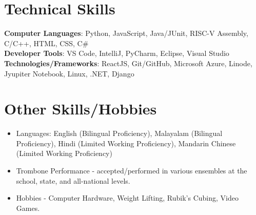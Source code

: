 \documentclass[letterpaper,11pt]{article}
\begin{document}
%
\section{Technical Skills}
 \begin{itemize}[leftmargin=0.15in, label={}]
    \small{\item{
      \textbf{Computer Languages}{: Python, JavaScript, Java/JUnit, RISC-V Assembly, C/C++, HTML, CSS, C\#} \\
      \textbf{Developer Tools}{: VS Code, IntelliJ, PyCharm, Eclipse, Visual Studio} \\
     \textbf{Technologies/Frameworks}{: ReactJS, Git/GitHub, Microsoft Azure, Linode, Jyupiter Notebook, Linux, .NET, Django} \\
    }}

 \end{itemize}
 \vspace{-16pt}
 
 

\section{Other Skills/Hobbies}

    \begin{itemize}
      
      \setlength\itemsep{-1pt}
      \item\small{Languages: English (Bilingual Proficiency), Malayalam (Bilingual Proficiency), Hindi (Limited Working Proficiency), Mandarin Chinese (Limited Working Proficiency)}
      \item{Trombone Performance - accepted/performed in various ensembles at the school, state, and all-national levels.}
      \item{Hobbies - Computer Hardware, Weight Lifting, Rubik's Cubing, Video Games.}
    \end{itemize}
                
\end{document}
